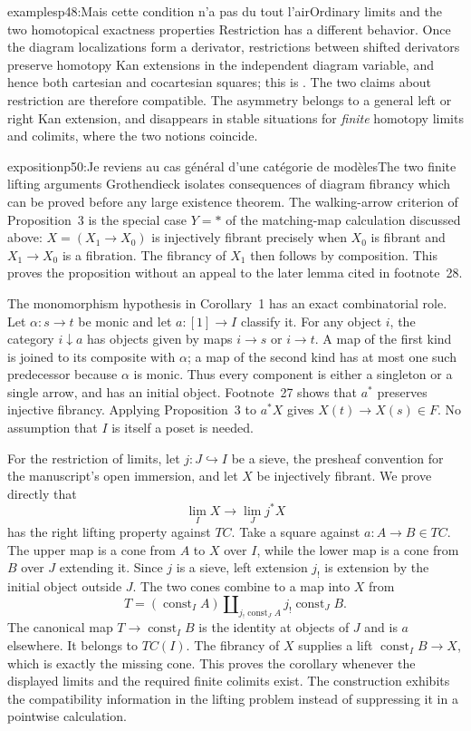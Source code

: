 \begin{dcomment}{examples}{p48:Mais cette condition n'a pas du tout l'air}{Ordinary limits and the two homotopical exactness properties}
Restriction has a different behavior. Once the diagram localizations form a derivator, restrictions between shifted derivators preserve homotopy Kan extensions in the independent diagram variable, and hence both cartesian and cocartesian squares; this is \citet[Proposition~2.5]{Groth2013}. The two claims about restriction are therefore compatible. The asymmetry belongs to a general left or right Kan extension, and disappears in stable situations for \emph{finite} homotopy limits and colimits, where the two notions coincide.
\end{dcomment}

\begin{dcomment}{exposition}{p50:Je reviens au cas général d'une catégorie de modèles}{The two finite lifting arguments}
Grothendieck isolates consequences of diagram fibrancy which can be proved before any large existence theorem. The walking-arrow criterion of Proposition~3 is the special case $Y=*$ of the matching-map calculation discussed above: $X=(X_1\to X_0)$ is injectively fibrant precisely when $X_0$ is fibrant and $X_1\to X_0$ is a fibration. The fibrancy of $X_1$ then follows by composition. This proves the proposition without an appeal to the later lemma cited in footnote~28.

The monomorphism hypothesis in Corollary~1 has an exact combinatorial role. Let $\alpha:s\to t$ be monic and let $a:[1]\to I$ classify it. For any object $i$, the category $i\downarrow a$ has objects given by maps $i\to s$ or $i\to t$. A map of the first kind is joined to its composite with $\alpha$; a map of the second kind has at most one such predecessor because $\alpha$ is monic. Thus every component is either a singleton or a single arrow, and has an initial object. Footnote~27 shows that $a^*$ preserves injective fibrancy. Applying Proposition~3 to $a^*X$ gives $X(t)\to X(s)\in F$. No assumption that $I$ is itself a poset is needed.

For the restriction of limits, let $j:J\hookrightarrow I$ be a sieve, the presheaf convention for the manuscript's open immersion, and let $X$ be injectively fibrant. We prove directly that
\[
 \lim_I X\longrightarrow\lim_J j^*X
\]
has the right lifting property against $TC$. Take a square against $a:A\to B\in TC$. The upper map is a cone from $A$ to $X$ over $I$, while the lower map is a cone from $B$ over $J$ extending it. Since $j$ is a sieve, left extension $j_!$ is extension by the initial object outside $J$. The two cones combine to a map into $X$ from
\[
 T=(\operatorname{const}_I A)
 \mathbin{\amalg}_{j_!\operatorname{const}_J A}
 j_!\operatorname{const}_J B.
\]
The canonical map $T\to\operatorname{const}_I B$ is the identity at objects of $J$ and is $a$ elsewhere. It belongs to $TC(I)$. The fibrancy of $X$ supplies a lift $\operatorname{const}_I B\to X$, which is exactly the missing cone. This proves the corollary whenever the displayed limits and the required finite colimits exist. The construction exhibits the compatibility information in the lifting problem instead of suppressing it in a pointwise calculation.
\end{dcomment}


